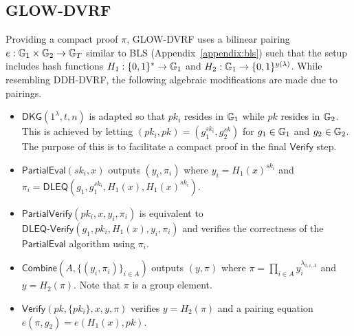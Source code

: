 \subsection{GLOW-DVRF}
\label{appendix:glow-dvrf}
Providing a compact proof $\pi$, GLOW-DVRF uses a bilinear pairing $e: \mathbb{G}_1 \times \mathbb{G}_2 \rightarrow \mathbb{G}_T$ similar to BLS (Appendix~\ref{appendix:bls}) such that the setup includes hash functions $H_1: \{0, 1\}^* \rightarrow \mathbb{G}_1$ and $H_2: \mathbb{G}_1 \rightarrow \{0, 1\}^{y(\lambda)}$. While resembling DDH-DVRF, the following algebraic modifications are made due to pairings.
\begin{itemize}
\item $\mathsf{DKG}(1^\lambda, t, n)$ is adapted so that $pk_i$ resides in $\mathbb{G}_1$ while $pk$ resides in $\mathbb{G}_2$. This is achieved by letting $(pk_i, pk) = (g_1^{sk_i}, g_2^{sk})$ for $g_1 \in \mathbb{G}_1$ and $g_2 \in \mathbb{G}_2$. The purpose of this is to facilitate a compact proof in the final $\mathsf{Verify}$ step.
\item $\mathsf{PartialEval}(sk_i, x)$ outputs $(y_i, \pi_i)$ where $y_i = H_1(x)^{sk_i}$ and $\pi_i = \mathsf{DLEQ}(g_1, g_1^{sk_i}, H_1(x), H_1(x)^{sk_i})$.
\item $\mathsf{PartialVerify}(pk_i, x, y_i, \pi_i)$ is equivalent to $\mathsf{DLEQ}\text{-}\mathsf{Verify}(g_1, pk_i, H_1(x), y_i, \pi_i)$ and verifies the correctness of the $\mathsf{PartialEval}$ algorithm using $\pi_i$.
\item $\mathsf{Combine}(A, \{(y_i, \pi_i)\}_{i \in A})$ outputs $(y, \pi)$ where $\pi = \prod_{i \in A} y_i^{\lambda_{0, i, A}}$ and $y = H_2(\pi)$. Note that $\pi$ is a group element.
\item $\mathsf{Verify}(pk, \{pk_i\}, x, y, \pi)$ verifies $y = H_2(\pi)$ and a pairing equation $e(\pi, g_2) = e(H_1(x), pk)$.
\end{itemize}

